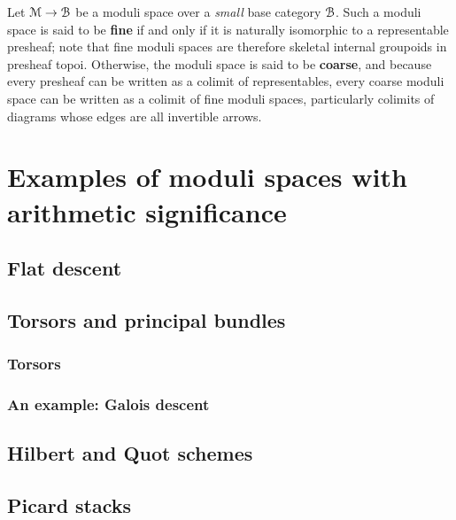             \begin{definition} \label{def: fine_and_coarse_moduli_spaces}  
                Let $\mathcal{M} \to \mathcal{B}$ be a moduli space over a \textit{small} base category $\mathcal{B}$. Such a moduli space is said to be \textbf{fine} if and only if it is naturally isomorphic to a representable presheaf; note that fine moduli spaces are therefore skeletal internal groupoids in presheaf topoi. Otherwise, the moduli space is said to be \textbf{coarse}, and because every presheaf can be written as a colimit of representables, every coarse moduli space can be written as a colimit of fine moduli spaces, particularly colimits of diagrams whose edges are all invertible arrows.
            \end{definition} 

    \section{Examples of moduli spaces with arithmetic significance}
        \subsection{Flat descent}
        
        \subsection{Torsors and principal bundles}
            \subsubsection{Torsors}
            
            \subsubsection{An example: Galois descent}
        
        \subsection{Hilbert and Quot schemes}
    
        \subsection{Picard stacks}
